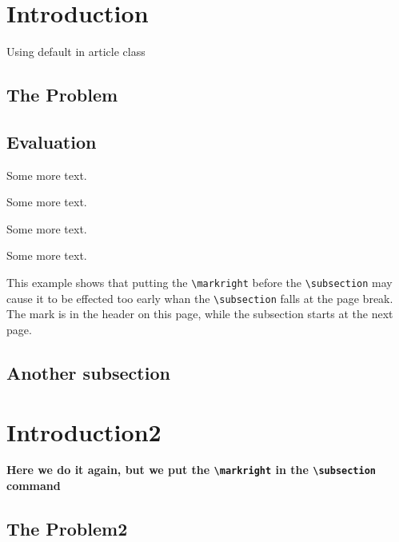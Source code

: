\documentclass{article}
\begin{document}
\section{Introduction}

Using default in article class

\subsection{The Problem}
\label{sec:problem}

\lipsum[1]

\subsection{Evaluation}

\lipsum

Some more text.

Some more text.

Some more text.

Some more text.

This example shows that putting the \verb+\markright+ before the \verb+\subsection+ may cause it to be effected too early whan the \verb+\subsection+ falls at the page break. The mark is in the header on this page, while the subsection starts at the next page.

%
\subsection*{Another subsection}
\label{sec:another-section}

\lipsum[3]

\newpage
\section{Introduction2}

{\bfseries Here we do it again, but we put the \verb+\markright+ in the \verb+\subsection+ command}

\subsection{The Problem2}
\label{sec:problem}
\end{document}

